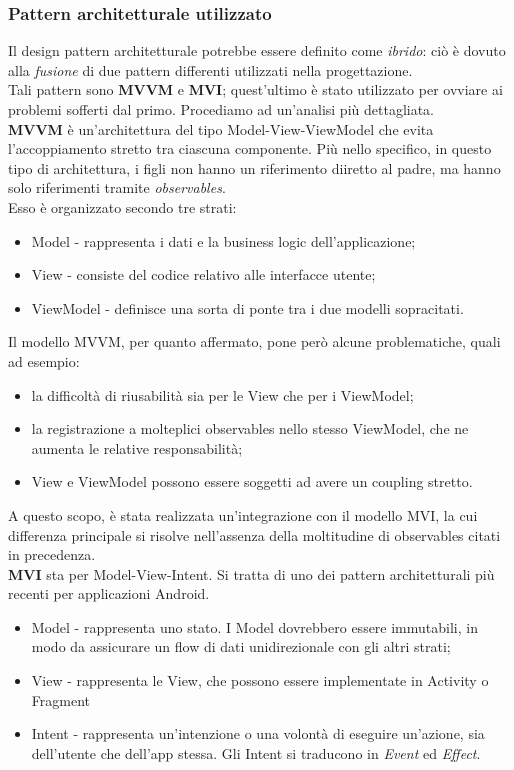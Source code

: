 \documentclass{natourDoc}
\begin{document}
\newpage
\subsubsection{Pattern architetturale utilizzato}
Il design pattern architetturale potrebbe essere definito come \textit{ibrido}: ciò è dovuto alla
\textit{fusione} di due pattern differenti utilizzati nella progettazione. \\
Tali pattern sono \textbf{MVVM} e \textbf{MVI}; quest'ultimo è stato utilizzato per ovviare ai problemi
sofferti dal primo. Procediamo ad un'analisi più dettagliata. \\

\textbf{MVVM} è un'architettura del tipo Model-View-ViewModel che evita l'accoppiamento stretto
tra ciascuna componente. Più nello specifico, in questo tipo di architettura, i figli non hanno un
riferimento diiretto al padre, ma hanno solo riferimenti tramite \textit{observables}.\\
Esso è organizzato secondo tre strati:
\begin{itemize}
	\item Model - rappresenta i dati e la business logic dell'applicazione;
	\item View - consiste del codice relativo alle interfacce utente;
	\item ViewModel - definisce una sorta di ponte tra i due modelli sopracitati.
\end{itemize}

Il modello MVVM, per quanto affermato, pone però alcune problematiche, quali ad esempio:
\begin{itemize}
	\item la difficoltà di riusabilità sia per le View che per i ViewModel;
	\item la registrazione a molteplici observables nello stesso ViewModel, che ne aumenta le relative responsabilità;
	\item View e ViewModel possono essere soggetti ad avere un coupling stretto.
\end{itemize}

A questo scopo, è stata realizzata un'integrazione con il modello MVI, la cui differenza principale si risolve nell'assenza
della moltitudine di observables citati in precedenza. \\

\textbf{MVI} sta per Model-View-Intent. Si tratta di uno dei pattern architetturali più recenti per applicazioni Android.
\begin{itemize}
	\item Model - rappresenta uno stato. I Model dovrebbero essere immutabili, in modo da
	      assicurare un flow di dati unidirezionale con gli altri strati;
	\item View - rappresenta le View, che possono essere implementate in Activity o Fragment
	\item Intent - rappresenta un'intenzione o una volontà di eseguire un'azione, sia dell'utente
	      che dell'app stessa. Gli Intent si traducono in \textit{Event} ed \textit{Effect}.
\end{itemize}
\end{document}
